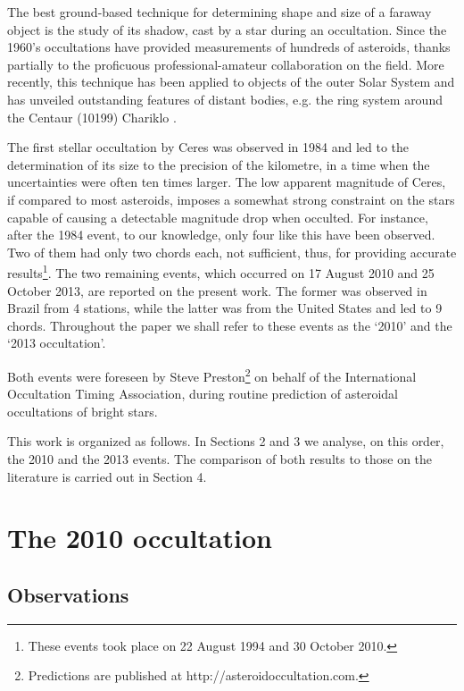 \documentclass[useAMS,usenatbib]{mn2e}
\begin{document}
The best ground-based technique for determining shape and size of a faraway object is the study of its shadow, cast by a star during an occultation. Since the 1960's occultations have provided measurements of hundreds of asteroids, thanks partially to the proficuous professional-amateur collaboration on the field. More recently, this technique has been applied to objects of the outer Solar System and has unveiled outstanding features of distant bodies, e.g. the ring system around the Centaur (10199) Chariklo \citep{BragaRibas2014}.

The first stellar occultation by Ceres was observed in 1984 \citep{Millis1987} and led to the determination of its size to the precision of the kilometre, in a time when the uncertainties were often ten times larger. The low apparent magnitude of Ceres, if compared to most asteroids, imposes a somewhat strong constraint on the stars capable of causing a detectable magnitude drop when occulted. For instance, after the 1984 event, to our knowledge, only four like this have been observed. Two of them had only two chords each, not sufficient, thus, for providing accurate results\footnote{These events took place on 22 August 1994 and 30 October 2010.}. The two remaining events, which occurred on 17 August 2010 and 25 October 2013, are reported on the present work. The former was observed in Brazil from 4 stations, while the latter was from the United States and led to 9 chords. Throughout the paper we shall refer to these events as the `2010' and the `2013 occultation'.

Both events were foreseen by Steve Preston\footnote{Predictions are published at http://asteroidoccultation.com.} on behalf of the International Occultation Timing Association, during routine prediction of asteroidal occultations of bright stars.

This work is organized as follows. In Sections 2 and 3 we analyse, on this order, the 2010 and the 2013 events. The comparison of both results to those on the literature is carried out in Section 4.






\section[]{The 2010 occultation}

\subsection{Observations}
\end{document}
